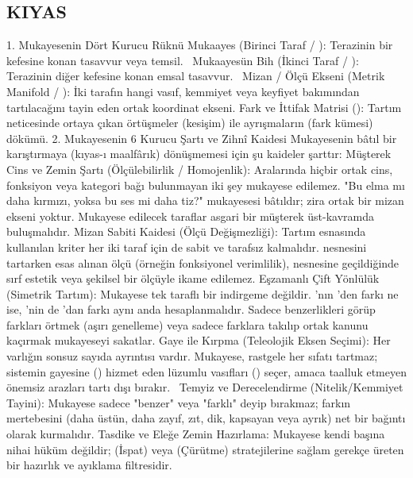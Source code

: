 \documentclass[11pt,a4paper]{article}
\begin{document}
\subsection{KIYAS}




1. Mukayesenin Dört Kurucu Rüknü
 Mukaayes (Birinci Taraf / ): Terazinin bir kefesine konan tasavvur veya temsil.  
 Mukaayesün Bih (İkinci Taraf / ): Terazinin diğer kefesine konan emsal tasavvur.  
 Mizan / Ölçü Ekseni (Metrik Manifold / ): İki tarafın hangi vasıf, kemmiyet veya keyfiyet bakımından tartılacağını tayin eden ortak koordinat ekseni.
 Fark ve İttifak Matrisi (): Tartım neticesinde ortaya çıkan örtüşmeler (kesişim) ile ayrışmaların (fark kümesi) dökümü.
2. Mukayesenin 6 Kurucu Şartı ve Zihnî Kaidesi
Mukayesenin bâtıl bir karıştırmaya (kıyas-ı maalfârık) dönüşmemesi için şu kaideler şarttır:
 Müşterek Cins ve Zemin Şartı (Ölçülebilirlik / Homojenlik):
Aralarında hiçbir ortak cins, fonksiyon veya kategori bağı bulunmayan iki şey mukayese edilemez. "Bu elma mı daha kırmızı, yoksa bu ses mi daha tiz?" mukayesesi bâtıldır; zira ortak bir mizan ekseni yoktur. Mukayese edilecek taraflar asgari bir müşterek üst-kavramda buluşmalıdır.
 Mizan Sabiti Kaidesi (Ölçü Değişmezliği):
Tartım esnasında kullanılan kriter her iki taraf için de sabit ve tarafsız kalmalıdır.  nesnesini tartarken esas alınan ölçü (örneğin fonksiyonel verimlilik),  nesnesine geçildiğinde sırf estetik veya şekilsel bir ölçüyle ikame edilemez.
 Eşzamanlı Çift Yönlülük (Simetrik Tartım):
Mukayese tek taraflı bir indirgeme değildir. 'nın 'den farkı ne ise, 'nin de 'dan farkı aynı anda hesaplanmalıdır. Sadece benzerlikleri görüp farkları örtmek (aşırı genelleme) veya sadece farklara takılıp ortak kanunu kaçırmak mukayeseyi sakatlar.
 Gaye ile Kırpma (Teleolojik Eksen Seçimi):
Her varlığın sonsuz sayıda ayrıntısı vardır. Mukayese, rastgele her sıfatı tartmaz; sistemin gayesine () hizmet eden lüzumlu vasıfları () seçer, amaca taalluk etmeyen önemsiz arazları tartı dışı bırakır.  
 Temyiz ve Derecelendirme (Nitelik/Kemmiyet Tayini):
Mukayese sadece "benzer" veya "farklı" deyip bırakmaz; farkın mertebesini (daha üstün, daha zayıf, zıt, dik, kapsayan veya ayrık) net bir bağıntı olarak kurmalıdır.
 Tasdike ve Eleğe Zemin Hazırlama:
Mukayese kendi başına nihai hüküm değildir;  (İspat) veya  (Çürütme) stratejilerine sağlam gerekçe üreten bir hazırlık ve ayıklama filtresidir.
\end{document}
